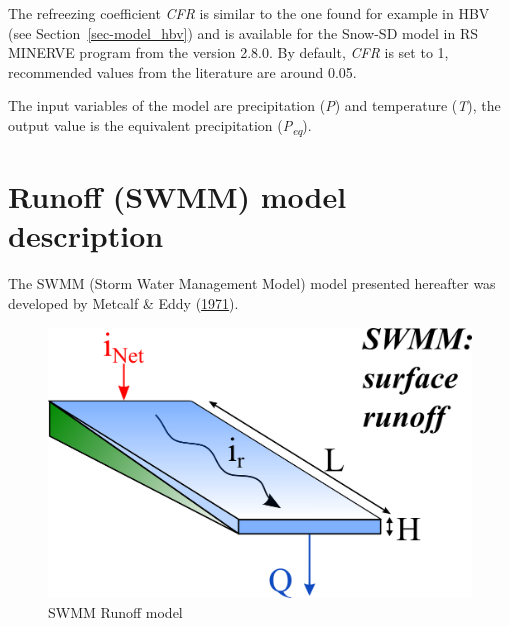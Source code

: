 \documentclass[
  letterpaper,
  DIV=11,
  numbers=noendperiod]{scrreprt}
\begin{document}
The refreezing coefficient \emph{CFR} is similar to the one found for
example in HBV (see Section~\ref{sec-model_hbv}) and is available for
the Snow-SD model in RS MINERVE program from the version 2.8.0. By
default, \emph{CFR} is set to 1, recommended values from the literature
are around 0.05.

The input variables of the model are precipitation (\emph{P}) and
temperature (\emph{T}), the output value is the equivalent precipitation
(\emph{P\textsubscript{eq}}).

\hypertarget{sec-model_swmm}{%
\chapter{Runoff (SWMM) model description}\label{sec-model_swmm}}

The SWMM (Storm Water Management Model) model presented hereafter was
developed by Metcalf \& Eddy
(\protect\hyperlink{ref-metcalf__eddy_storm_1971}{1971}).

\begin{figure}

{\centering \includegraphics{./figures/fig-model_swmm.png}

}

\caption{\label{fig-model_swmm}SWMM Runoff model}

\end{figure}
\end{document}
